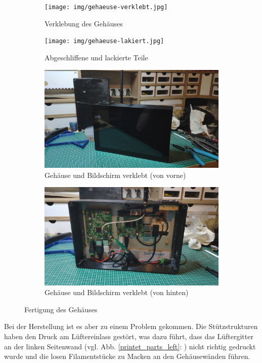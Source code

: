 \begin{figure}[H]
	\begin{subfigure}[b]{0.5\linewidth}
		\centering
		\texttt{[image: img/gehaeuse-verklebt.jpg]}
		\caption[Verklebung des Gehäuses]{Verklebung des Gehäuses}
		\label{fig:glued_parts}
	\end{subfigure}
	\begin{subfigure}[b]{0.5\linewidth}
		\centering
		\texttt{[image: img/gehaeuse-lakiert.jpg]}
		\caption[Abgeschliffene und lackierte Teile]{Abgeschliffene und lackierte Teile}
		\label{fig:filed_and_painted_parts}
	\end{subfigure}
	\begin{subfigure}[b]{0.5\linewidth}
		\centering
		\includegraphics[width=1\textwidth]{img/geraet_front.jpg}
		\caption[Gehäuse und Bildschirm verklebt (von vorne)]{Gehäuse und Bildschirm verklebt (von vorne)}
		\label{fig:finished_case_front}
	\end{subfigure}
	\begin{subfigure}[b]{0.5\linewidth}
		\centering
		\includegraphics[width=1\textwidth]{img/geraet_rueck.jpg}
		\caption[Gehäuse und Bildschirm verklebt (von hinten)]{Gehäuse und Bildschirm verklebt (von hinten)}
		\label{fig:finished_case_back}
	\end{subfigure}
	\caption[Fertigung des Gehäuses]{Fertigung des Gehäuses}
	\label{fig:creating-case}
\end{figure}\par
\noindent Bei der Herstellung ist es aber zu einem Problem gekommen. 
Die Stützstrukturen haben den Druck am Lüftereinlass gestört, was dazu führt, dass das Lüftergitter an der  linken Seitenwand (vgl. Abb. \ref{printet_parts_left}: ) nicht richtig gedruckt wurde und die losen Filamentstücke zu Macken an den Gehäusewänden führen.